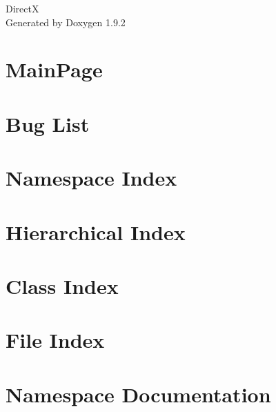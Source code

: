 \documentclass[twoside]{book}
\newcommand{\+}{\discretionary{\mbox{\scriptsize$\hookleftarrow$}}{}{}}
\newcommand{\clearemptydoublepage}{%
    \newpage{\pagestyle{empty}\cleardoublepage}%
  }
\begin{document}
  \raggedbottom
  \begin{titlepage}
  \vspace*{7cm}
  \begin{center}%
  {\Large DirectX}\\
  \vspace*{1cm}
  {\large Generated by Doxygen 1.9.2}\\
  \end{center}
  \end{titlepage}
  \clearemptydoublepage
  \tableofcontents
  \clearemptydoublepage
\chapter{Main\+Page}
\label{index}
\chapter{Bug List}
\label{bug}

\chapter{Namespace Index}

\chapter{Hierarchical Index}

\chapter{Class Index}

\chapter{File Index}

\chapter{Namespace Documentation}


\end{document}
